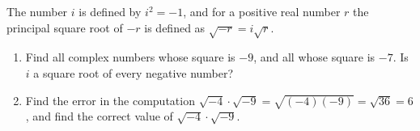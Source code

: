 The number $i$ is defined by $i^2=-1$, and for a positive real number $r$ the principal square root of $-r$ is defined as $\sqrt{-r}=i\sqrt r$.
\begin{enumerate}
\item[(a)] Find all complex numbers whose square is $-9$, and all whose square is $-7$. Is $i$ a square root of every negative number?
\item[(b)] Find the error in the computation $\sqrt{-4}\cdot\sqrt{-9}=\sqrt{(-4)(-9)}=\sqrt{36}=6$, and find the correct value of $\sqrt{-4}\cdot\sqrt{-9}$.
\end{enumerate}

